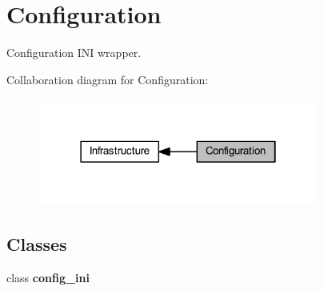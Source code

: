 \section{Configuration}
\label{group__configuration}


Configuration I\+NI wrapper.  


Collaboration diagram for Configuration\+:
\nopagebreak
\begin{figure}[H]
\begin{center}
\leavevmode
\includegraphics[width=262pt]{group__configuration}
\end{center}
\end{figure}
\subsection*{Classes}
\begin{DoxyCompactItemize}
\item 
class \textbf{ config\+\_\+ini}
\end{DoxyCompactItemize}
